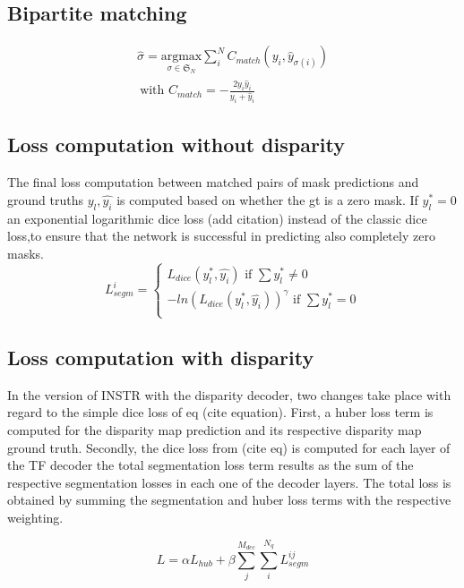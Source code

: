 \subsection{Bipartite matching}

\begin{gather}
    \hat{\sigma} = \underset{\sigma \in \mathfrak{S}_{N}}{\mathrm{argmax}}\sum_{i}^{N}C_{match}(y_i, \hat{y}_{\sigma(i)}) \\\
    \text{with } C_{match} = - \frac{2 y_i \hat{y}_{i}}{ y_i + \hat{y}_{i}} %
\end{gather}

\subsection{Loss computation without disparity}
The final loss computation between matched pairs of mask predictions and ground truths $y_{l}, \hat{y_{i}}$ is computed based on whether the gt is  a zero mask. If $y_{l}^{*} = 0$ an exponential logarithmic dice loss (add citation) instead of the classic dice loss,to ensure that the network is successful in predicting also completely zero masks. 
\begin{equation}
L_{segm}^{i} = 
    \begin{cases}    
        L_{dice}(y_{l}^{*}, \hat{y_{i}}) \text{      if } \sum y_{l}^{*} \neq 0\\
        -ln(L_{dice}(y_{l}^{*}, \hat{y_{i}}))^{\gamma} \text{      if } \sum y_{l}^{*} = 0\\
    \end{cases}
\end{equation}

\subsection{Loss computation with disparity}
In the version of INSTR with the disparity decoder, two changes take place with regard to the simple dice loss of eq (cite equation). First, a huber loss term is computed for the disparity map prediction and its respective disparity map ground truth. Secondly, the dice loss from (cite eq) is computed for each layer of the TF decoder the total segmentation loss term results as the sum of the respective segmentation losses in each one of the decoder layers. The total loss is obtained by summing the segmentation and huber loss terms with the respective weighting.

\begin{equation}
L = \alpha L_{hub} + \beta \sum_{j}^{M_{dec}} \sum_{i}^{N_q} L_{segm}^{ij}  
\end{equation}




